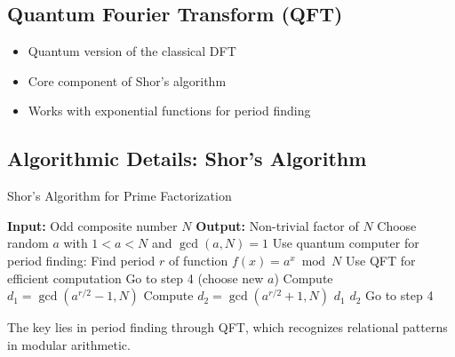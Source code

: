 	\subsection{Quantum Fourier Transform (QFT)}
	
	\begin{itemize}
		\item Quantum version of the classical DFT
		\item Core component of Shor's algorithm
		\item Works with exponential functions for period finding
	\end{itemize}
	
	\subsection{Algorithmic Details: Shor's Algorithm}
	
	\begin{algorithm}[H]
\scriptsize
		\caption{Shor's Algorithm for Prime Factorization}
		\label{alg:shor}
		\begin{algorithmic}[1]
			\STATE \textbf{Input:} Odd composite number $N$
			\STATE \textbf{Output:} Non-trivial factor of $N$
			\STATE 
			\STATE Choose random $a$ with $1 < a < N$ and $\gcd(a,N) = 1$
			\STATE Use quantum computer for period finding:
			\STATE \quad Find period $r$ of function $f(x) = a^x \bmod N$
			\STATE \quad Use QFT for efficient computation
			\STATE Go to step 4 (choose new $a$)
			\ENDIF
			\STATE Compute $d_1 = \gcd(a^{r/2} - 1, N)$
			\STATE Compute $d_2 = \gcd(a^{r/2} + 1, N)$
			\RETURN $d_1$
			\RETURN $d_2$
			\ELSE
			\STATE Go to step 4
			\ENDIF
		\end{algorithmic}
	\end{algorithm}
	
	The key lies in period finding through QFT, which recognizes relational patterns in modular arithmetic.
	
	\begin{table}[htbp]
		\centering
		\begin{adjustbox}{width=0.85\textwidth}
		\end{adjustbox}
		\caption{Relational algorithms in practice}
		\label{tab:algorithmen}
	\end{table}
	
